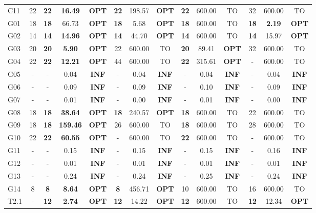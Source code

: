 \documentclass[letterpaper,journal]{IEEEtran}
\begin{document}
\begin{table}[htbp]
{\begin{tabular}{l c ccc ccc ccc ccc}
C11 & 22 & \textbf{22} & \textbf{16.49} & \textbf{OPT} & \textbf{22} & 198.57 & \textbf{OPT} & \textbf{22} & 600.00 & TO & 32 & 600.00 & TO \\
G01 & 18 & \textbf{18} & 66.73 & \textbf{OPT} & \textbf{18} & 5.68 & \textbf{OPT} & \textbf{18} & 600.00 & TO & \textbf{18} & \textbf{2.19} & \textbf{OPT} \\
G02 & 14 & \textbf{14} & \textbf{14.96} & \textbf{OPT} & \textbf{14} & 44.70 & \textbf{OPT} & \textbf{14} & 600.00 & TO & \textbf{14} & 15.97 & \textbf{OPT} \\
G03 & 20 & \textbf{20} & \textbf{5.90} & \textbf{OPT} & 22 & 600.00 & TO & \textbf{20} & 89.41 & \textbf{OPT} & 32 & 600.00 & TO \\
G04 & 22 & \textbf{22} & \textbf{12.21} & \textbf{OPT} & 44 & 600.00 & TO & \textbf{22} & 315.61 & \textbf{OPT} & - & 600.00 & TO \\
G05 & - & - & 0.04 & \textbf{INF} & - & 0.04 & \textbf{INF} & - & 0.04 & \textbf{INF} & - & 0.04 & \textbf{INF} \\
G06 & - & - & 0.09 & \textbf{INF} & - & 0.09 & \textbf{INF} & - & 0.10 & \textbf{INF} & - & 0.09 & \textbf{INF} \\
G07 & - & - & 0.01 & \textbf{INF} & - & 0.00 & \textbf{INF} & - & 0.01 & \textbf{INF} & - & 0.00 & \textbf{INF} \\
G08 & 18 & \textbf{18} & \textbf{38.64} & \textbf{OPT} & \textbf{18} & 240.57 & \textbf{OPT} & \textbf{18} & 600.00 & TO & 22 & 600.00 & TO \\
G09 & 18 & \textbf{18} & \textbf{159.46} & \textbf{OPT} & 26 & 600.00 & TO & \textbf{18} & 600.00 & TO & 28 & 600.00 & TO \\
G10 & 22 & \textbf{22} & \textbf{60.55} & \textbf{OPT} & - & 600.00 & TO & \textbf{22} & 600.00 & TO & - & 600.00 & TO \\
G11 & - & - & 0.15 & \textbf{INF} & - & 0.15 & \textbf{INF} & - & 0.15 & \textbf{INF} & - & 0.16 & \textbf{INF} \\
G12 & - & - & 0.01 & \textbf{INF} & - & 0.01 & \textbf{INF} & - & 0.01 & \textbf{INF} & - & 0.01 & \textbf{INF} \\
G13 & - & - & 0.24 & \textbf{INF} & - & 0.24 & \textbf{INF} & - & 0.25 & \textbf{INF} & - & 0.24 & \textbf{INF} \\
G14 & 8 & \textbf{8} & \textbf{8.64} & \textbf{OPT} & \textbf{8} & 456.71 & \textbf{OPT} & 10 & 600.00 & TO & 16 & 600.00 & TO \\
T2.1 & - & \textbf{12} & \textbf{2.74} & \textbf{OPT} & \textbf{12} & 14.22 & \textbf{OPT} & \textbf{12} & 600.00 & TO & \textbf{12} & 12.34 & \textbf{OPT} \\

\end{tabular}}
\end{table}
\end{document}
